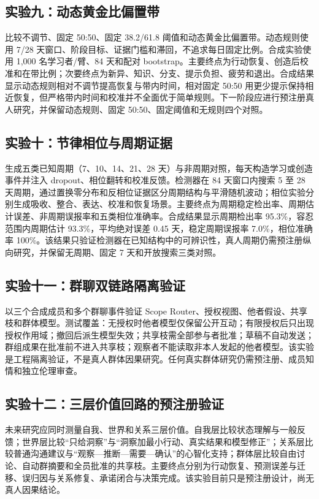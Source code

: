 \documentclass[UTF8,a4paper,11pt]{ctexart}
\begin{document}
\subsection{实验九：动态黄金比偏置带}

比较不调节、固定 50:50、固定 38.2/61.8 阈值和动态黄金比偏置带。动态规则使用 7/28 天窗口、阶段目标、证据门槛和滞回，不追求每日固定比例。合成实验使用 1,000 名学习者/臂、84 天和配对 bootstrap。主要终点为行动恢复、创造后校准和在带比例；次要终点为新异、知识、分支、提示负担、疲劳和退出。合成结果显示动态规则相对不调节提高恢复与带内时间，相对固定 50:50 用更少提示保持相近恢复，但严格带内时间和校准并不全面优于简单规则。下一阶段应进行预注册真人研究，并保留动态规则、固定 50:50、固定阈值和无规则四个对照。

\subsection{实验十：节律相位与周期证据}

生成五类已知周期（7、10、14、21、28 天）与非周期对照，每天构造学习或创造事件并注入 dropout、相位翻转和校准反馈。检测器在 84 天窗口内搜索 5 至 28 天周期，通过置换零分布和反相位证据区分周期结构与平滑随机波动；相位实验分别生成吸收、整合、表达、校准和恢复场景。主要终点为周期稳定检出率、周期估计误差、非周期误报率和五类相位准确率。合成结果显示周期检出率 95.3\%，容忍范围内周期估计 93.3\%，平均绝对误差 0.45 天，稳定周期误报率 7.0\%，相位准确率 100\%。该结果只验证检测器在已知结构中的可辨识性，真人周期仍需预注册纵向研究，并保留无周期、固定 7 天和开放搜索三类对照。

\subsection{实验十一：群聊双链路隔离验证}

以三个合成成员和多个群聊事件验证 Scope Router、授权视图、他者假设、共享枝和群体模型。测试覆盖：无授权时他者模型仅保留公开互动；有限授权后只出现授权作用域；撤回后派生模型失效；共享枝需全部参与者批准；草稿不自动发送；群组成果在批准前不进入共享枝；观察者不能读取非本人发起的他者模型。该实验是工程隔离验证，不是真人群体因果研究。任何真实群体研究仍需预注册、成员知情和独立伦理审查。

\subsection{实验十二：三层价值回路的预注册验证}

未来研究应同时测量自我、世界和关系三层价值。自我层比较状态理解与一般反馈；世界层比较“只给洞察”与“洞察加最小行动、真实结果和模型修正”；关系层比较普通沟通建议与“观察—推断—需要—确认”的心智化支持；群体层比较自由讨论、自动群摘要和全员批准的共享枝。主要终点分别为行动恢复、预测误差与迁移、误归因与关系修复、承诺闭合与决策完成。该实验目前只是预注册设计，尚无真人因果结论。
\end{document}
